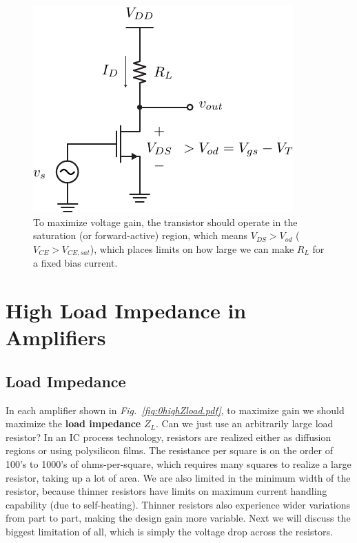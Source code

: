 \begin{figure}[H]
\centering
\includegraphics[scale=1]{1cs_headroom.pdf}
\caption{To maximize voltage gain, the transistor should operate in the saturation (or forward-active) region, which means $V_{DS} > V_{od}$ ($V_{CE} > V_{CE,sat}$), which places limits on how large we can make $R_L$ for a fixed bias current.}
\label{fig:1cs_headroom.pdf}
\end{figure}
\section{High Load Impedance in Amplifiers}
\subsection{Load Impedance}
In each amplifier shown in \emph{Fig.~\ref{fig:0highZload.pdf}}, to maximize gain we should maximize the \textbf{load impedance} $Z_L$.  Can we just use an arbitrarily large load resistor?  In an IC process technology, resistors are realized either as diffusion regions or using polysilicon films.  The resistance per square is on the order of 100's to 1000's of ohms-per-square, which requires many squares to realize a large resistor, taking up a lot of area.  We are also limited in the minimum width of the resistor, because thinner resistors have limits on maximum current handling capability (due to self-heating).  Thinner resistors also experience wider variations from part to part, making the design gain more variable.  Next we will discuss the biggest limitation of all, which is simply the voltage drop across the resistors. 
